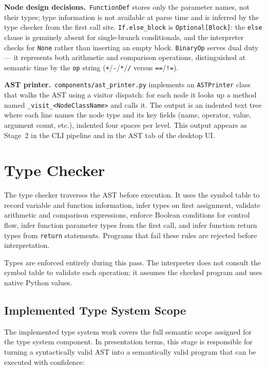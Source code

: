 \textbf{Node design decisions.}\ \texttt{FunctionDef} stores only the
parameter names, not their types; type information is not available at parse
time and is inferred by the type checker from the first call site.
\texttt{If.else\_block} is \texttt{Optional[Block]}: the \texttt{else} clause
is genuinely absent for single-branch conditionals, and the interpreter checks
for \texttt{None} rather than inserting an empty block. \texttt{BinaryOp}
serves dual duty — it represents both arithmetic and comparison operations,
distinguished at semantic time by the \texttt{op} string
(\texttt{+}/\texttt{-}/\texttt{*}/\texttt{/} versus \texttt{==}/\texttt{!=}).

\textbf{AST printer.}\ \texttt{components/ast\_printer.py} implements an
\texttt{ASTPrinter} class that walks the AST using a visitor dispatch: for each
node it looks up a method named \texttt{\_visit\_<NodeClassName>} and calls it.
The output is an indented text tree where each line names the node type and
its key fields (name, operator, value, argument count, etc.), indented four
spaces per level. This output appears as Stage~2 in the CLI pipeline and in
the AST tab of the desktop UI.

\section{Type Checker}
The type checker traverses the AST before execution. It uses the symbol table
to record variable and function information, infer types on first assignment,
validate arithmetic and comparison expressions, enforce Boolean conditions for
control flow, infer function parameter types from the first call, and infer
function return types from \texttt{return} statements. Programs that fail these
rules are rejected before interpretation.

Types are enforced entirely during this pass. The interpreter does not consult
the symbol table to validate each operation; it assumes the checked program and
uses native Python values.

\subsection{Implemented Type System Scope}
The implemented type system work covers the full semantic scope assigned for the
type system component. In presentation terms, this stage is responsible for
turning a syntactically valid AST into a semantically valid program that can be
executed with confidence:

